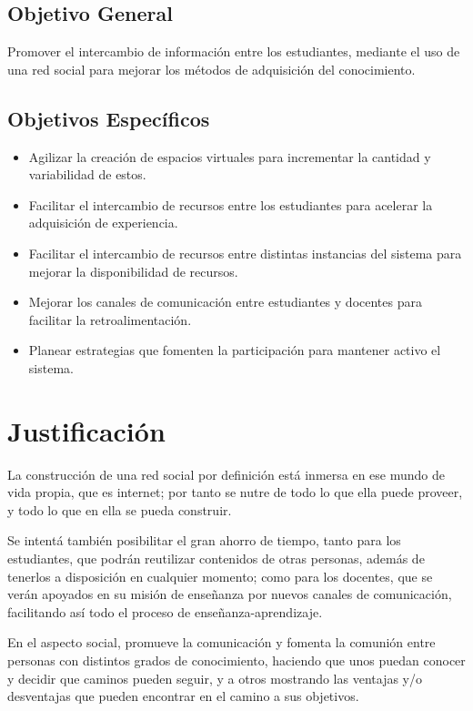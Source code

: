 \subsection{Objetivo General}
Promover el intercambio de información entre los estudiantes, mediante el uso de una red social para mejorar los métodos
de adquisición del conocimiento.

\subsection{Objetivos Específicos}
\begin{itemize}
\item Agilizar la creación de espacios virtuales para incrementar la cantidad y variabilidad de estos.
\item Facilitar el intercambio de recursos entre los estudiantes para acelerar la adquisición de experiencia.
\item Facilitar el intercambio de recursos entre distintas instancias del sistema para mejorar la disponibilidad de 
recursos.
\item Mejorar los canales de comunicación entre estudiantes y docentes para facilitar la retroalimentación.
\item Planear estrategias que fomenten la participación para mantener activo el sistema.
\end{itemize}

\section{Justificación}
La construcción de una red social por definición está inmersa en ese mundo de vida propia, que es internet; por tanto se
nutre de todo lo que ella puede proveer, y todo lo que en ella se pueda construir.

Se intentá también posibilitar el gran ahorro de tiempo, tanto para los estudiantes, que podrán reutilizar contenidos de
otras personas, además de tenerlos a disposición en cualquier momento; como para los docentes, que se verán apoyados en
su misión de enseñanza por nuevos canales de comunicación, facilitando así todo el proceso de enseñanza-aprendizaje.

En el aspecto social, promueve la comunicación y fomenta la comunión entre personas con distintos grados de conocimiento,
haciendo que unos puedan conocer y decidir que caminos pueden seguir, y a otros mostrando las ventajas y/o desventajas
que pueden encontrar en el camino a sus objetivos.

